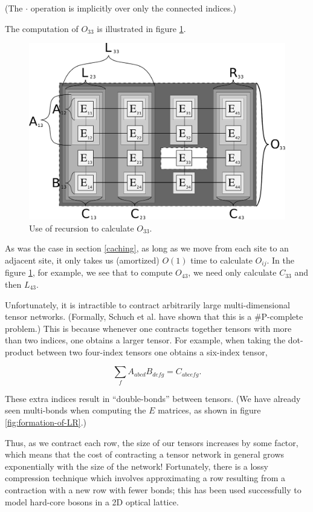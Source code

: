 \documentclass{amsbook}
\theoremstyle{plain}
\theoremstyle{definition}
\theoremstyle{remark}
\begin{document}
\noindent (The $\cdot$ operation is implicitly over only the connected indices.)

The computation of $O_{33}$ is illustrated in figure \ref{fig:2d-recursive-structure}.

\begin{figure}
\centering
\includegraphics[width=\columnwidth]{images/mypaper-diagram-38}
\caption{Use of recursion to calculate $O_{33}$. \label{fig:2d-recursive-structure}}
\end{figure}

As was the case in section \ref{caching}, as long as we move from each site to an adjacent site, it only takes us (amortized) $O(1)$ time to calculate $O_{ij}$.  In the figure \ref{fig:2d-recursive-structure}, for example, we see that to compute $O_{43}$, we need only calculate $C_{33}$ and then $L_{43}$.

Unfortunately, it is intractible to contract arbitrarily large multi-dimensional tensor networks.  (Formally, Schuch et al. \cite{quant-ph/0611050} have shown that this is a \#P-complete problem.)  This is because whenever one contracts together tensors with more than two indices, one obtains a larger tensor.  For example, when taking the dot-product between two four-index tensors one obtains a six-index tensor,

$$\sum_f A_{abcd} B_{defg} = C_{abcefg}.$$

\noindent These extra indices result in ``double-bonds'' between tensors.  (We have already seen multi-bonds when computing the $E$ matrices, as shown in figure \ref{fig:formation-of-LR}.)

Thus, as we contract each row, the size of our tensors increases by some factor, which means that the cost of contracting a tensor network in general grows exponentially with the size of the network!  Fortunately, there is a lossy compression technique which involves approximating a row resulting from a contraction with a new row with fewer bonds;  this has been used successfully to model hard-core bosons in a 2D optical lattice\cite{cond-mat/0611522}.
\end{document}
